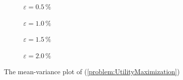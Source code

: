 \documentclass[a4paper, english, 11pt, onecolumn, oneside, final]{article}
\numberwithin{equation}{section}   %
\theoremstyle{plain}
\theoremstyle{definition}
\theoremstyle{remark}
\begin{document}
\begin{figure}[h]
\centering
    \begin{subfigure}{0.5\linewidth}
    
    \caption{$\varepsilon = 0.5\,\%$}
    \end{subfigure}\hfill
    \begin{subfigure}{0.5\linewidth}
    
    \caption{$\varepsilon = 1.0\,\%$}
    \end{subfigure}

    \begin{subfigure}{0.5\linewidth}
    
    \caption{$\varepsilon = 1.5\,\%$}
    \end{subfigure}\hfill
    \begin{subfigure}{0.5\linewidth}
    
    \caption{$\varepsilon = 2.0\,\%$}
    \end{subfigure}
\caption{The mean-variance plot of (\ref{problem:UtilityMaximization})}
\label{fig:plotMeanVarianceUtilityMaximization}
\end{figure}
\newpage\mbox{}\newpage
\end{document}
